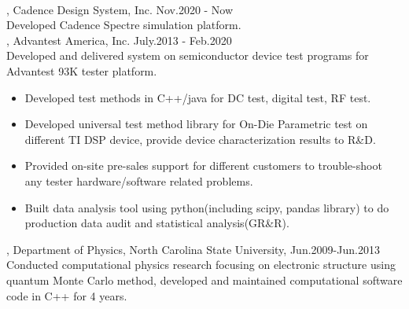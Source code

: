 \documentclass[11pt]{article} %
\begin{document}
\\
, Cadence Design System, Inc. Nov.2020 - Now\\
\noindent Developed Cadence Spectre simulation platform.\\
, Advantest America, Inc. July.2013 - Feb.2020\\
\noindent Developed and delivered system on semiconductor device test programs for Advantest 93K tester platform.\\ 
\begin{itemize}
  
    \item Developed test methods in C++/java for DC test, digital test, RF test.\\
 \vspace{-4mm}
    \item  Developed universal test method library for On-Die Parametric test on different TI DSP device, provide device characterization results to R\&D.\\ 
 \vspace{-4mm}
  \item Provided on-site pre-sales support for different customers to trouble-shoot any tester hardware/software related problems.\\ 
  \vspace{-4mm}
 \item  Built data analysis tool using python(including scipy, pandas library) to do production data audit and statistical analysis(GR\&R).

  
 \end{itemize}

, Department of Physics, North Carolina State University, Jun.2009-Jun.2013\\
\noindent Conducted computational physics research focusing on electronic structure using quantum Monte Carlo method, developed and maintained computational software code in C++ for 4 years.\\
\end{document}
